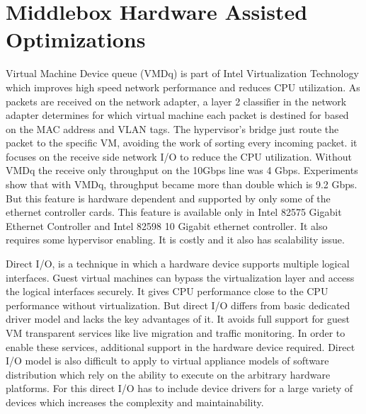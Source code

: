 \documentclass[a4paper,11pt]{report}
\begin{document}
\section{Middlebox Hardware Assisted Optimizations}
Virtual Machine Device queue (VMDq)\cite{VMD} is part of Intel Virtualization Technology which improves high speed network performance and reduces CPU utilization. As packets are received on the network adapter, a layer 2 classifier in the network adapter determines for which virtual machine each packet is destined for based on the MAC address and VLAN tags. The hypervisor's bridge just route the packet to the specific VM,  avoiding the work of sorting every incoming packet. it focuses on the receive side network I/O to reduce the CPU utilization. Without VMDq the receive only throughput on the 10Gbps line was 4 Gbps. Experiments show that with VMDq, throughput became more than double which is 9.2 Gbps. But this feature is hardware dependent and supported by only some of the ethernet controller cards. This feature is available only in Intel 82575 Gigabit Ethernet Controller and Intel 82598 10 Gigabit ethernet controller. It also requires some hypervisor enabling. It is costly and it also has scalability issue.

Direct I/O\cite{Santos:2008:BGS:1404014.1404017}, is a technique in which a hardware device supports multiple logical interfaces. Guest virtual machines can bypass the virtualization layer and access the logical interfaces securely. It gives CPU performance close to the CPU performance without virtualization. But direct I/O differs from basic dedicated driver model and lacks the key advantages of it. It avoids full support for guest VM transparent services like live migration and traffic monitoring. In order to enable these services, additional support in the hardware device required. Direct I/O model is also difficult to apply to virtual appliance models of software distribution which rely on the ability to execute on the arbitrary hardware platforms. For this direct I/O has to include device drivers for a large variety of devices which increases the complexity and maintainability.
\end{document}

